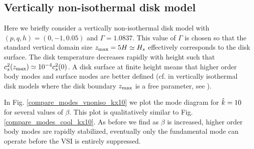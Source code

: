 \subsection{Vertically non-isothermal disk model} 





Here we briefly consider a vertically non-isothermal
disk model with $(p,q, h)=(0,-1,0.05)$ and $\Gamma=1.0837$. This
value of $\Gamma$ is chosen so that the standard vertical domain size $z_\mathrm{max} =
5H\simeq H_s$ effectively corresponds to the disk surface. The disk
temperature decreases rapidly with height such that
$c_s^2(z_\mathrm{max})\simeq 10^{-4}c_s^2(0)$. A disk surface at finite height
means that higher order body modes and surface modes are better
defined (cf. in vertically isothermal disk models where the disk
boundary $z_\mathrm{max}$ is a free parameter, see ). 


In Fig. \ref{compare_modes_vnoniso_kx10} we plot the mode diagram for
$\hat{k}=10$ for several values of $\beta$. This plot is 
qualitatively similar to Fig. \ref{compare_modes_cool_kx10}. As before
we find as $\beta$ is increased, higher order body modes are rapidly
stabilized, eventually only the fundamental mode can operate before
the VSI is entirely suppressed.  


